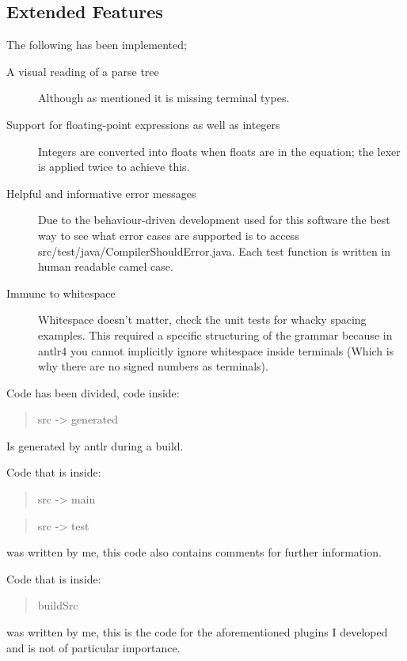 \documentclass[a4paper,12pt]{article}
\begin{document}
\subsection{Extended Features}
The following has been implemented;
\begin{description}
    \item[A visual reading of a parse tree] \hfill
        Although as mentioned it is missing terminal types.
    \item[Support for floating-point expressions as well as integers] \hfill
        Integers are converted into floats when floats are in the equation; the lexer is applied twice to achieve this.
    \item[Helpful and informative error messages]
        Due to the behaviour-driven development used for this software the best way to see what error cases are supported is to access src/test/java/CompilerShouldError.java. Each test function is written in human readable camel case.
    \item[Immune to whitespace]
       Whitespace doesn't matter, check the unit tests for whacky spacing examples. This required a specific structuring of the grammar because in antlr4 you cannot implicitly ignore whitespace inside terminals (Which is why there are no signed numbers as terminals).
\end{description}

Code has been divided, code inside:
\begin{quotation}
src -> generated
\end{quotation}
Is generated by antlr during a build.


Code that is inside:
\begin{quotation}
src -> main
\end{quotation}
\begin{quotation}
src -> test
\end{quotation}
was written by me, this code also contains comments for further information.

Code that is inside:
\begin{quotation}
buildSrc
\end{quotation}
was written by me, this is the code for the aforementioned plugins I developed and is not of particular importance.
\end{document}
